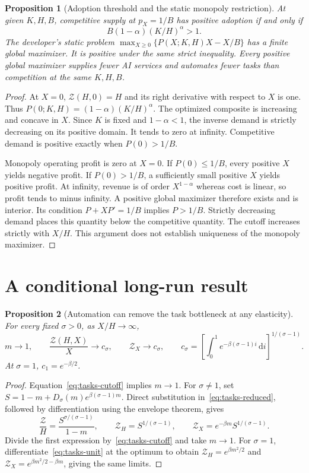 \documentclass[11pt]{article}
\newtheorem{proposition}{Proposition}
\newcommand{\dd}{\,\mathrm d}
\begin{document}
\begin{proposition}[Adoption threshold and the static monopoly restriction]
At given $K,H,B$, competitive supply at $p_X=1/B$ has positive adoption if and only if
\begin{equation}
 B(1-\alpha)(K/H)^\alpha>1.
 \label{eq:tasks-adoption-threshold}
\end{equation}
The developer's static problem
$\max_{X\geq0}\{P(X;K,H)X-X/B\}$ has a finite global maximizer.
It is positive under the same strict inequality. Every positive global
maximizer supplies fewer AI services and automates fewer tasks than competition
at the same $K,H,B$.
\end{proposition}
\begin{proof}
At $X=0$, $\mathcal Z(H,0)=H$ and its right derivative with respect to $X$ is one.
Thus $P(0;K,H)=(1-\alpha)(K/H)^\alpha$. The optimized composite is
increasing and concave in $X$. Since $K$ is fixed and $1-\alpha<1$,
the inverse demand is strictly decreasing on its positive domain.
It tends to zero at infinity. Competitive demand is positive exactly when
$P(0)>1/B$.

Monopoly operating profit is zero at $X=0$. If $P(0)\leq1/B$, every
positive $X$ yields negative profit. If $P(0)>1/B$, a sufficiently small
positive $X$ yields positive profit. At infinity, revenue is of order
$X^{1-\alpha}$ whereas cost is linear, so profit tends to minus infinity.
A positive global maximizer therefore exists and is interior. Its condition
$P+XP'=1/B$ implies $P>1/B$. Strictly decreasing demand places this quantity
below the competitive quantity. The cutoff increases strictly with $X/H$.
This argument does not establish uniqueness of the monopoly maximizer.
\end{proof}

\section{A conditional long-run result}
\begin{proposition}[Automation can remove the task bottleneck at any elasticity]
For every fixed $\sigma>0$, as $X/H\to\infty$,
\begin{equation}
 m\to1,\qquad \frac{\mathcal Z(H,X)}X\to c_\sigma,\qquad
 \mathcal Z_X\to c_\sigma,\qquad
 c_\sigma=\left[\int_0^1e^{-\beta(\sigma-1)i}\dd i\right]^{1/(\sigma-1)}.
 \label{eq:tasks-linear-limit}
\end{equation}
At $\sigma=1$, $c_1=e^{-\beta/2}$.
\end{proposition}
\begin{proof}
Equation~\eqref{eq:tasks-cutoff} implies $m\to1$.
For $\sigma\ne1$, set $S=1-m+D_\sigma(m)e^{\beta(\sigma-1)m}$.
Direct substitution in~\eqref{eq:tasks-reduced}, followed by differentiation
using the envelope theorem, gives
\[
 \frac{\mathcal Z}H=\frac{S^{\sigma/(\sigma-1)}}{1-m},\qquad
 \mathcal Z_H=S^{1/(\sigma-1)},\qquad
 \mathcal Z_X=e^{-\beta m}S^{1/(\sigma-1)}.
\]
Divide the first expression by~\eqref{eq:tasks-cutoff} and take $m\to1$.
For $\sigma=1$, differentiate~\eqref{eq:tasks-unit} at the optimum to obtain
$\mathcal Z_H=e^{\beta m^2/2}$ and
$\mathcal Z_X=e^{\beta m^2/2-\beta m}$, giving the same limits.
\end{proof}
\end{document}
